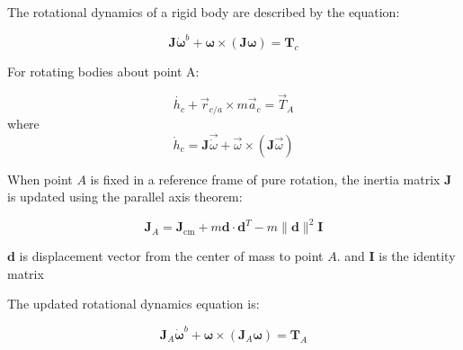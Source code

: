 The rotational dynamics of a rigid body are described by the equation:

\[
\mathbf{J} \dot{\boldsymbol{\omega}}^b + \boldsymbol{\omega} \times (\mathbf{J} \boldsymbol{\omega}) = \mathbf{T}_c
\]


For rotating bodies about point A:

\[
\dot{h_c} + \vec{r}_{c/a} \times m \vec{a}_c = \vec{T}_A
\]
where 
\[
\dot{h}_c = \mathbf{J} \vec{\dot{\omega}} + \vec{\omega} \times (\mathbf{J} \vec{\omega})
\]

When point \( A \) is fixed in a reference frame of pure rotation, the inertia matrix \( \mathbf{J} \) is updated using the parallel axis theorem:

\[
\mathbf{J}_A = \mathbf{J}_{\text{cm}} + m \mathbf{d} \cdot \mathbf{d}^T - m \|\mathbf{d}\|^2 \mathbf{I}
\]

 $\textbf{d}$ is displacement vector from the center of mass to point \( A \). and $\textbf{I}$ is the identity matrix

The updated rotational dynamics equation is:

\[
\mathbf{J}_A \dot{\boldsymbol{\omega}}^b + \boldsymbol{\omega} \times (\mathbf{J}_A \boldsymbol{\omega}) = \mathbf{T}_A
\]


